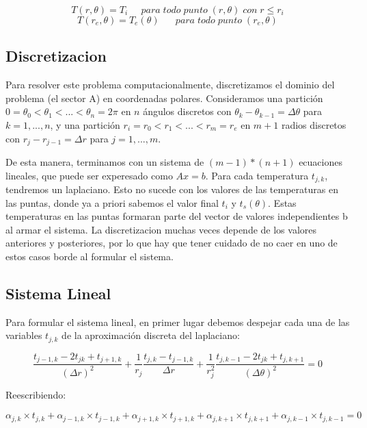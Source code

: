 \begin{equation}
T(r,\theta) = T_i \;\;\;\;\;para\;todo\;punto\;(r,\theta)\;con\;r\leq r_i
\end{equation}
\begin{equation}
T(r_e,\theta) = T_e(\theta) \;\;\;\;\;\;para\;todo\;punto\;(r_e,\theta)
\end{equation}

\subsection{Discretizacion}

Para resolver este problema computacionalmente, discretizamos el dominio del problema (el sector A) en coordenadas polares. Consideramos una partici\'on $0 = \theta_0 < \theta_1 < ... < \theta_n = 2\pi$ en $n$ \'angulos discretos con $\theta_k-\theta_{k-1} = \Delta\theta$ para $k = 1,...,n$, y una partici\'on $r_i = r_0 < r_1 < ... < r_m = r_e$ en $m+1$ radios discretos con $r_j - r_{j-1} = \Delta r$ para $j = 1,...,m$.

De esta manera, terminamos con un sistema de $(m-1)*(n+1)$ ecuaciones lineales, que puede ser experesado como $Ax = b$. Para cada temperatura $t_{j,k}$, tendremos un laplaciano. Esto no sucede con los valores de las temperaturas en las puntas, donde ya a priori sabemos el valor final $t_i$ y $t_s(\theta)$. Estas temperaturas en las puntas formaran parte del vector de valores independientes b al armar el sistema. La discretizacion muchas veces depende de los valores anteriores y posteriores, por lo que hay que tener cuidado de no caer en uno de estos casos borde al formular el sistema.

\subsection{Sistema Lineal}
Para formular el sistema lineal, en primer lugar debemos despejar cada una de las variables $t_{j,k}$ de la aproximación discreta del laplaciano:

\begin{equation}\label{calor}
\frac{t_{j-1,k}-2t_{jk}+t_{j+1,k}}{(\Delta r)^2}
+ \frac{1}{r_j}
\frac{t_{j,k}-t_{j-1,k}}{\Delta r}
+
\frac{1}{r_j^2}
\frac{t_{j,k-1}-2t_{jk}+t_{j,k+1}}{(\Delta \theta)^2} = 0
\end{equation}

Reescribiendo:

\begin{equation}
\alpha_{j,k} \times t_{j,k} + \alpha_{j-1,k} \times t_{j-1,k} + \alpha_{j+1,k} \times t_{j+1,k} + \alpha_{j,k+1} \times t_{j,k+1} + \alpha_{j,k-1} \times t_{j,k-1} = 0
\end{equation}

